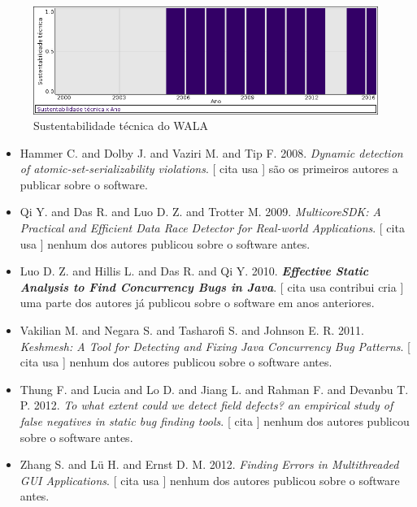 \begin{figure}[h]
  \center
  \includegraphics[scale=0.50]{imagens/softwares-charts/wala.png}
  \caption{Sustentabilidade técnica do WALA}
\end{figure}


\begin{itemize}
\item Hammer C. and Dolby J. and Vaziri M. and Tip F.
      2008.
        \textit{ Dynamic detection of atomic-set-serializability violations}.
      [
          cita
          usa
      ]
são os primeiros autores a publicar sobre o software.
\item Qi Y. and Das R. and Luo D. Z. and Trotter M.
      2009.
        \textit{ MulticoreSDK: A Practical and Efficient Data Race Detector for Real-world Applications}.
      [
          cita
          usa
      ]
nenhum dos autores publicou sobre o software antes.
\item Luo D. Z. and Hillis L. and Das R. and Qi Y.
      2010.
        \textbf{\textit{ Effective Static Analysis to Find Concurrency Bugs in Java}}.
      [
          cita
          usa
          contribui
          cria
      ]
uma parte dos autores já publicou sobre o software em anos anteriores.
\item Vakilian M. and Negara S. and Tasharofi S. and Johnson E. R.
      2011.
        \textit{ Keshmesh: A Tool for Detecting and Fixing Java Concurrency Bug Patterns}.
      [
          cita
          usa
      ]
nenhum dos autores publicou sobre o software antes.
\item Thung F. and Lucia and Lo D. and Jiang L. and Rahman F. and Devanbu T. P.
      2012.
        \textit{ To what extent could we detect field defects? an empirical study of false negatives in static bug finding tools}.
      [
          cita
      ]
nenhum dos autores publicou sobre o software antes.
\item Zhang S. and L\"{u} H. and Ernst D. M.
      2012.
        \textit{ Finding Errors in Multithreaded GUI Applications}.
      [
          cita
          usa
      ]
nenhum dos autores publicou sobre o software antes.

\end{itemize}
